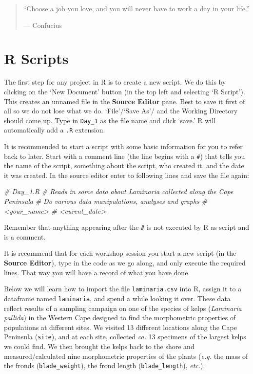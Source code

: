 \documentclass[
]{book}
\newenvironment{Shaded}{\begin{snugshade}}{\end{snugshade}}
\newcommand{\CommentTok}[1]{\textcolor[rgb]{0.56,0.35,0.01}{\textit{#1}}}
\begin{document}
\begin{quote}
``Choose a job you love, and you will never have to work a day in your life.''

--- Confucius
\end{quote}

\hypertarget{r-scripts}{%
\section{R Scripts}\label{r-scripts}}

The first step for any project in R is to create a new script. We do this by clicking on the `New Document' button (in the top left and selecting `R Script'). This creates an unnamed file in the \textbf{Source Editor} pane. Best to save it first of all so we do not lose what we do. `File'/`Save As'/ and the Working Directory should come up. Type in \texttt{Day\_1} as the file name and click `save.' R will automatically add a \texttt{.R} extension.

It is recommended to start a script with some basic information for you to refer back to later. Start with a comment line (the line begins with a \texttt{\#}) that tells you the name of the script, something about the script, who created it, and the date it was created. In the source editor enter to following lines and save the file again:

\begin{Shaded}
\begin{Highlighting}[]
\CommentTok{\# Day\_1.R}
\CommentTok{\# Reads in some data about Laminaria collected along the Cape Peninsula}
\CommentTok{\# Do various data manipulations, analyses and graphs}
\CommentTok{\# <your\_name>}
\CommentTok{\# <curent\_date>}
\end{Highlighting}
\end{Shaded}

Remember that anything appearing after the \texttt{\#} is not executed by R as script and is a comment.

It is recommend that for each workshop session you start a new script (in the \textbf{Source Editor}), type in the code as we go along, and only execute the required lines. That way you will have a record of what you have done.

Below we will learn how to import the file \texttt{laminaria.csv} into R, assign it to a dataframe named \texttt{laminaria}, and spend a while looking it over. These data reflect results of a sampling campaign on one of the species of kelps (\emph{Laminaria pallida}) in the Western Cape designed to find the morphometric properties of populations at different sites. We visited 13 different locations along the Cape Peninsula (\texttt{site}), and at each site, collected \emph{ca.} 13 specimens of the largest kelps we could find. We then brought the kelps back to the shore and measured/calculated nine morphometric properties of the plants (\emph{e.g.} the mass of the fronds (\texttt{blade\_weight}), the frond length (\texttt{blade\_length}), \emph{etc.}).
\end{document}

